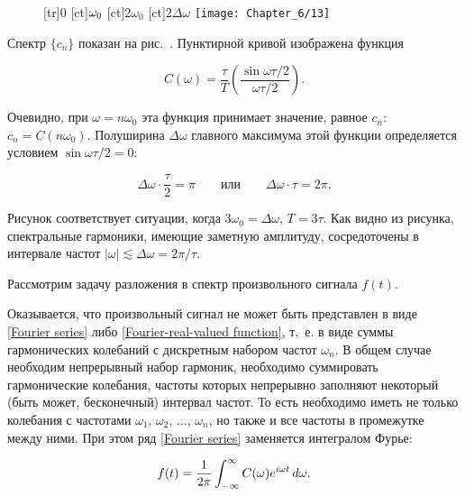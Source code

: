 \begin{figure}[h!]
	\small
	[tr]{0}
	[ct]{$\vphantom{2}\omega_0$}
	[ct]{$2\omega_0$}
	[ct]{$2\Delta\omega$}
	\texttt{[image: Chapter\_6/13]}
	\caption{}
\end{figure}

Спектр $\{c_n\}$ показан на рис.~. Пунктирной кривой изображена функция

\begin{equation*}
	C(\omega) =\frac{\tau}{T}\left(\frac{\sin\omega\tau/2}{\omega\tau/2}\right).
\end{equation*}

Очевидно, при $\omega=n\omega_0$ эта функция принимает значение, равное $c_n$: $c_n=C(n\omega_0)$. Полуширина $\Delta
\omega$ главного максимума этой функции определяется условием $\sin\omega\tau/2=0$:

\begin{equation*}
	\Delta\omega \cdot \frac{\tau}{2}=\pi\qquad \text{или} \qquad \Delta \omega \cdot \tau =2\pi.
\end{equation*}

Рисунок соответствует ситуации, когда $3\omega_0=\Delta\omega$, $T=3\tau$. Как видно из рисунка, спектральные гармоники,
имеющие заметную амплитуду, сосредоточены в интервале частот $|\omega|\lesssim \Delta\omega=2\pi/\tau$.


Рассмотрим задачу разложения в спектр произвольного сигнала $f(t)$.

Оказывается, что произвольный сигнал не может быть представлен в виде \eqref{Fourier series} либо \eqref{Fourier-real-valued function}, т.~е. в виде суммы
гармонических колебаний с дискретным набором частот $\omega_n$. В общем случае необходим непрерывный набор гармоник,
необходимо суммировать гармонические колебания, частоты которых непрерывно заполняют некоторый (быть может, бесконечный)
интервал частот. То есть необходимо иметь не только колебания с частотами $\omega_1$, $\omega_2$, $\dots$, $\omega_n$,
но также и все частоты в промежутке между ними. При этом ряд \eqref{Fourier series} заменяется интегралом Фурье:

\begin{equation}
	\eqmark{Fourier integral}
	f(t)=\frac{1}{2\pi}\int_{-\infty}^\infty C(\omega)e^{i\omega t}\,d\omega.
\end{equation}

